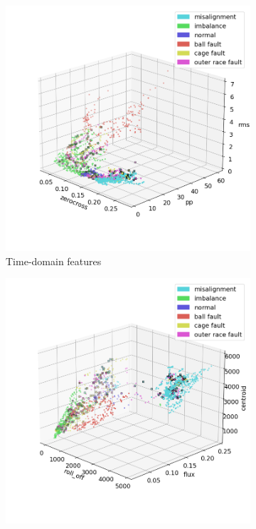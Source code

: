 \begin{figure}[ht]
    \centering
    \begin{subfigure}[b]{0.48\textwidth}
        \includegraphics[width=\textwidth]{assets/results/labels/TD.png}
        \caption{Time-domain features}
    \end{subfigure}
    \hfill
    \begin{subfigure}[b]{0.48\textwidth}
        \includegraphics[width=\textwidth]{assets/results/labels/FD.png}

\end{subfigure}
\end{figure}
